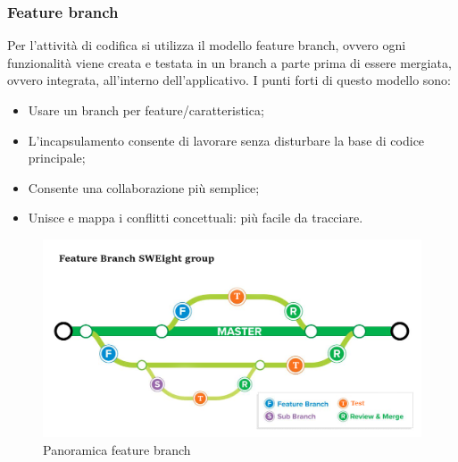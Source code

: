 \subsubsection{Feature branch}
Per l'attività di codifica si utilizza il modello feature branch, ovvero ogni funzionalità viene creata e testata in un branch a parte prima di essere mergiata, ovvero integrata, all'interno dell'applicativo.
I punti forti di questo modello sono:\\
\begin{itemize}
\item Usare un branch per feature/caratteristica;
\item L'incapsulamento consente di lavorare senza disturbare la base di codice principale;
\item Consente una collaborazione più semplice;
\item Unisce e mappa i conflitti concettuali: più facile da tracciare.
\end{itemize}
\begin{figure}[H]
\centering
\includegraphics[width=14cm,keepaspectratio]{img/pan-featurebranch.png}
\caption{Panoramica feature branch}
\end{figure}
